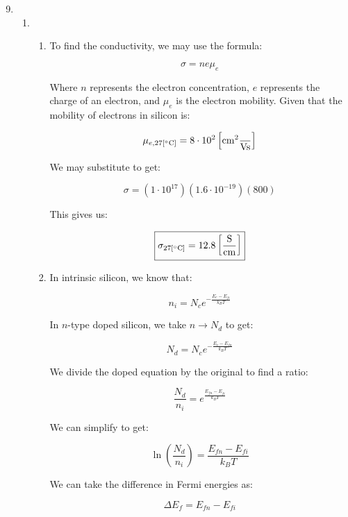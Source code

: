 \begin{enumerate}

    \setcounter{enumi}{8}

  \item

    \begin{enumerate}[label=\alph*.]

      \item 

        \begin{enumerate}[label=\arabic*.]

          \item To find the conductivity, we may use the formula:

            $$\sigma=ne\mu_e$$

            Where $n$ represents the electron concentration, $e$ represents the charge of an electron, and $\mu_e$ is the electron mobility. Given that the mobility of electrons in silicon is:

            $$\mu_{e,27[\si{\celsius}]}=8\cdot10^2\left[ \si{\centi\meter\squared\over\volt\second} \right]$$

            We may substitute to get:

            $$\sigma=\left( 1\cdot10^{17} \right)\left( 1.6\cdot10^{-19} \right)(800)$$

            This gives us:

            $$\boxed{\sigma_{27[\si{\celsius}]}=12.8\left[ \si{\siemens\over\centi\meter} \right]}$$

          \item In intrinsic silicon, we know that:

            $$n_i=N_ce^{-\frac{E_c-E_{fi}}{k_BT}}$$

            In $n$-type doped silicon, we take $n\to N_d$ to get:

            $$N_d=N_ce^{-\frac{E_c-E_{fn}}{k_BT}}$$

            We divide the doped equation by the original to find a ratio:

            $$\frac{N_d}{n_i}=e^{\frac{E_{fn}-E_{fi}}{k_BT}}$$

            We can simplify to get:

            $$\ln\left(\frac{N_d}{n_i}\right)=\frac{E_{fn}-E_{fi}}{k_BT}$$

            We can take the difference in Fermi energies as:

            $$\Delta E_f=E_{fn}-E_{fi}$$


\end{enumerate}
\end{enumerate}
\end{enumerate}
